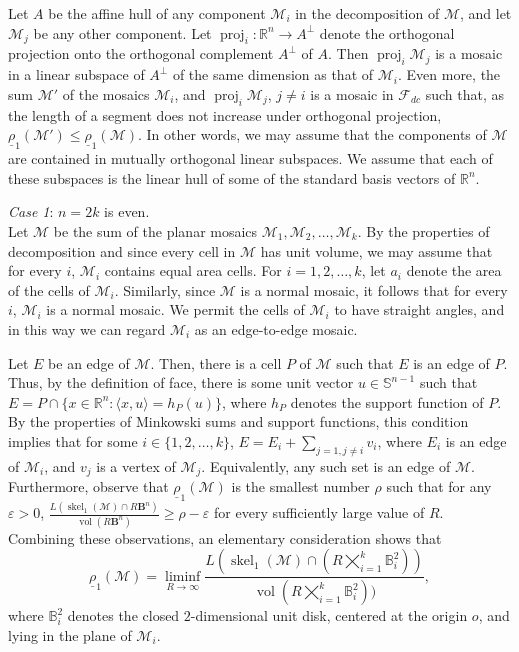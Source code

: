 \documentclass[twoside]{amsart}
\theoremstyle{definition}
\renewcommand{\Re}{\mathbb R}
\newcommand{\BB}{\mathbf B}
\newcommand{\M}{\mathcal{M}}
\newcommand{\F}{\mathcal{F}}
\DeclareMathOperator{\proj}{proj}
\DeclareMathOperator{\skel}{skel}
\DeclareMathOperator{\vol}{vol}
\begin{document}
Let $A$ be the affine hull of any component $\M_i$ in the decomposition of $\M$, and let $\M_j$ be any other component. Let $\proj_i : \Re^n \to A^{\perp}$ denote the orthogonal projection onto the orthogonal complement $A^{\perp}$ of $A$. Then $\proj_i \M_j$ is a mosaic in a linear subspace of $A^\perp$ of the same dimension as that of $\M_i$. Even more, the sum $\M'$ of the mosaics $\M_i$, and $\proj_i \M_j$, $j \neq i$ is a mosaic in $\F_{dc}$ such that, as the length of a segment does not increase under orthogonal projection, $\underline{\rho}_1 (\M') \leq \underline{\rho}_1(\M)$. In other words, we may assume that the components of $\M$ are contained in mutually orthogonal linear subspaces. We assume that each of these subspaces is the linear hull of some of the standard basis vectors of $\Re^n$.

\emph{Case 1}: $n=2k$ is even.\\
Let $\M$ be the sum of the planar mosaics $\M_1, \M_2, \ldots, \M_k$. By the properties of decomposition and since every cell in $\M$ has unit volume, we may assume that for every $i$, $\M_i$ contains equal area cells. For $i=1,2,\ldots, k$, let $a_i$ denote the area of the cells of $\M_i$. Similarly, since $\M$ is a normal mosaic, it follows that for every $i$, $\M_i$ is a normal mosaic. We permit the cells of $\M_i$ to have straight angles, and in this way we can regard $\M_i$ as an edge-to-edge mosaic.

Let $E$ be an edge of $\M$. Then, there is a cell $P$ of $\M$ such that $E$ is an edge of $P$. Thus, by the definition of face, there is some unit vector $u \in \mathbb{S}^{n-1}$ such that $E= P \cap \{ x \in \Re^n: \langle x, u \rangle = h_P(u) \}$, where $h_P$ denotes the support function of $P$. By the properties of Minkowski sums and support functions, this condition implies that for some $i \in \{ 1,2, \ldots, k \}$, $E = E_i + \sum_{j=1, j\neq i} v_i$, where $E_i$ is an edge of $\M_i$, and $v_j$ is a vertex of $\M_j$. Equivalently, any such set is an edge of $\M$. Furthermore, observe that $\underline{\rho}_1 (\M)$ is the smallest number $\rho$ such that for any $\varepsilon > 0$, $\frac{L(\skel_1(\M) \cap R \BB^n)}{\vol(R \BB^n)} \geq \rho-\varepsilon$ for every sufficiently large value of $R$. Combining these observations, an elementary consideration shows that
\begin{equation}\label{eq:liminf_even}
\underline{\rho}_1 (\M) = \liminf_{R \to \infty} \frac{L\left(\skel_1(\M) \cap \left( R \bigtimes_{i=1}^k \mathbb{B}_i^2 \right) \right)}{\vol\left( R \bigtimes_{i=1}^k \mathbb{B}_i^2 \right))},
\end{equation}
where $\mathbb{B}_i^2$ denotes the closed $2$-dimensional unit disk, centered at the origin $o$, and lying in the plane of $\M_i$.
\end{document}

